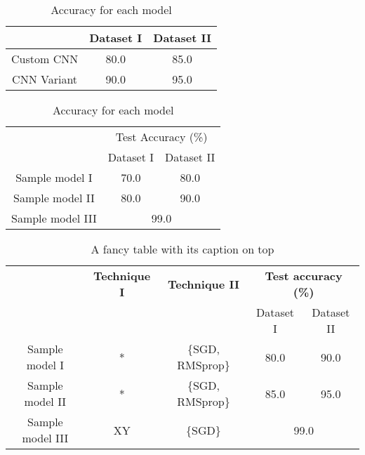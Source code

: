 \begin{table}[htbp]
  \centering
    \begin{tabular}{c|c|c}
      \hline
      & Dataset I & Dataset II \\ 
      \hline \hline

      Custom CNN & 80.0 & 85.0\\ \hline
      CNN Variant & 90.0 & 95.0 \\ \hline
      
    \end{tabular}
  \caption{Accuracy for each model}
  \label{table1}
\end{table}


\begin{table}[htbp]
  \centering
    \begin{tabular}{|c|c|c|}
      \hline
       & \multicolumn{2}{c|}{Test Accuracy (\%)} \\ \cline{2-3}
       & Dataset I & Dataset II \\ \hline \hline
      Sample model I & 70.0 & 80.0 \\ \hline
      Sample model II & 80.0 & 90.0 \\ \hline
      Sample model III & \multicolumn{2}{c|}{99.0} \\\hline

    \end{tabular}
  \caption{Accuracy for each model}
  \label{table2}
\end{table}


\begin{table}[!htbp]
  \begin{center}
    \caption{A fancy table with its caption on top}
    \label{table3}
    \begin{tabular}{|c|c|c|c|c|} 
    \hline
      & \textbf{Technique I} & \textbf{Technique II} &\multicolumn{2}{c|}{\textbf{Test accuracy (\%)} }\\ \cline{4-5}
      & & & Dataset I & Dataset II \\
      \hline \hline
        Sample model I & * & \{SGD, RMSprop\} & 80.0 & 90.0 \\ \hline
        Sample model II & * & \{SGD, RMSprop\} & 85.0 & 95.0 \\ \hline
        Sample model III & XY & \{SGD\} & \multicolumn{2}{c|}{99.0} \\
    \hline
    \end{tabular}
  \end{center}
\end{table}



